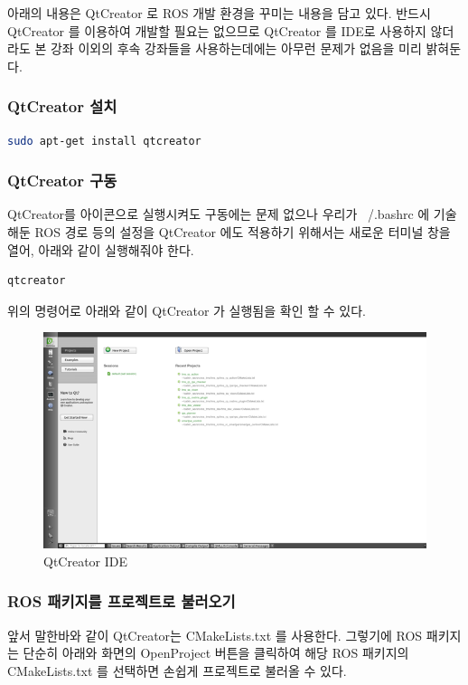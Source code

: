아래의 내용은 QtCreator 로 ROS 개발 환경을 꾸미는 내용을 담고 있다. 반드시 QtCreator 를 이용하여 개발할 필요는 없으므로 QtCreator 를 IDE로 사용하지 않더라도 본 강좌 이외의 후속 강좌들을 사용하는데에는 아무런 문제가 없음을 미리 밝혀둔다.

\subsubsection{QtCreator 설치}

\begin{lstlisting}[language=bash]
sudo apt-get install qtcreator
\end{lstlisting}

\subsubsection{QtCreator 구동}
QtCreator를 아이콘으로 실행시켜도 구동에는 문제 없으나 우리가 ~/.bashrc 에 기술해둔 ROS 경로 등의 설정을 QtCreator 에도 적용하기 위해서는 새로운 터미널 창을 열어, 아래와 같이 실행해줘야 한다.

\begin{lstlisting}[language=bash]
qtcreator
\end{lstlisting}

\noindent
위의 명령어로 아래와 같이 QtCreator 가 실행됨을 확인 할 수 있다.

\begin{figure}[h]
\centering\includegraphics[width=0.8\columnwidth]{pictures/chapter2/qtcreator1.png}
\caption{QtCreator IDE}
\end{figure}

\subsubsection{ROS 패키지를 프로젝트로 불러오기}
앞서 말한바와 같이 QtCreator는 CMakeLists.txt 를 사용한다. 그렇기에 ROS 패키지는 단순히 아래와 화면의 OpenProject 버튼을 클릭하여 해당 ROS 패키지의 CMakeLists.txt 를 선택하면 손쉽게 프로젝트로 불러올 수 있다.


